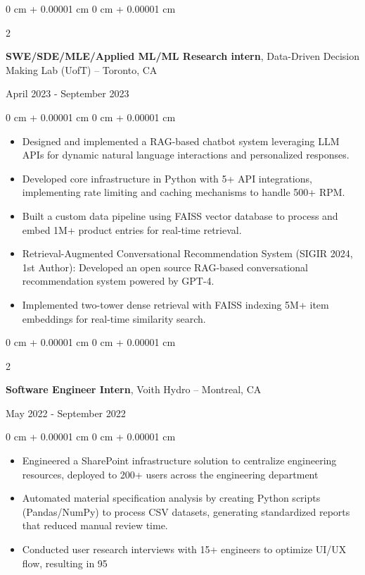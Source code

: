 \documentclass[11pt, letterpaper]{article}
\newenvironment{highlights}{
    \begin{itemize}[
        topsep=0.08 cm,
        parsep=0.08 cm,
        partopsep=0pt,
        itemsep=0pt,
        leftmargin=0.2 cm + 17pt
    ]
}
{
    \end{itemize}
}
\newenvironment{onecolentry}{
    \begin{adjustwidth}{
        0 cm + 0.00001 cm
    }{
        0 cm + 0.00001 cm
    }
}{
    \end{adjustwidth}
}
\newenvironment{twocolentry}[2][]{
    \onecolentry
    \def\secondColumn{#2}
    \setcolumnwidth{\fill, 4.5 cm}
    \begin{paracol}{2}
}{
    \switchcolumn \raggedleft \secondColumn
    \end{paracol}
    \endonecolentry
}
\begin{document}
\begin{twocolentry}{April 2023 - September 2023}
    {\textbf{SWE/SDE/MLE/Applied ML/ML Research intern}}, Data-Driven Decision Making Lab (UofT) -- Toronto, CA  
\end{twocolentry}  
\vspace{0.05 cm}
\begin{onecolentry}
    \begin{highlights}
        \item Designed and implemented a RAG-based chatbot system leveraging LLM APIs for dynamic natural language interactions and personalized responses.
        \item Developed core infrastructure in Python with 5+ API integrations, implementing rate limiting and caching mechanisms to handle 500+ RPM.
        \item Built a custom data pipeline using FAISS vector database to process and embed 1M+ product entries for real-time retrieval.
        \item Retrieval-Augmented Conversational Recommendation System (SIGIR 2024, 1st Author): Developed an open source RAG-based conversational recommendation system powered by GPT-4.
        \item Implemented two-tower dense retrieval with FAISS indexing 5M+ item embeddings for real-time similarity search.
    \end{highlights}
\end{onecolentry}
\vspace{0.15 cm}

\begin{twocolentry}{May 2022 - September 2022}
    {\textbf{Software Engineer Intern}}, Voith Hydro -- Montreal, CA  
\end{twocolentry}  
\vspace{0.05 cm}
\begin{onecolentry}
    \begin{highlights}
        \item Engineered a SharePoint infrastructure solution to centralize engineering resources, deployed to 200+ users across the engineering department
        \item Automated material specification analysis by creating Python scripts (Pandas/NumPy) to process CSV datasets, generating standardized reports that reduced manual review time.
        \item Conducted user research interviews with 15+ engineers to optimize UI/UX flow, resulting in 95%
    \end{highlights}
\end{onecolentry}
\end{document}
